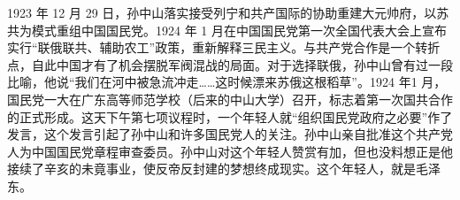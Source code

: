 1923 年 12 月 29 日，孙中山落实接受列宁和共产国际的协助重建大元帅府，以苏共为模式重组中国国民党。1924 年 1 月在中国国民党第一次全国代表大会上宣布实行“联俄联共、辅助农工”政策，重新解释三民主义。与共产党合作是一个转折点，自此中国才有了机会摆脱军阀混战的局面。对于选择联俄，孙中山曾有过一段比喻，他说“我们在河中被急流冲走……这时候漂来苏俄这根稻草”。1924 年1 月，国民党一大在广东高等师范学校（后来的中山大学）召开，标志着第一次国共合作的正式形成。这天下午第七项议程时，一个年轻人就“组织国民党政府之必要”作了发言，这个发言引起了孙中山和许多国民党人的关注。孙中山亲自批准这个共产党人为中国国民党章程审查委员。孙中山对这个年轻人赞赏有加，但也没料想正是他接续了辛亥的未竟事业，使反帝反封建的梦想终成现实。这个年轻人，就是毛泽东。